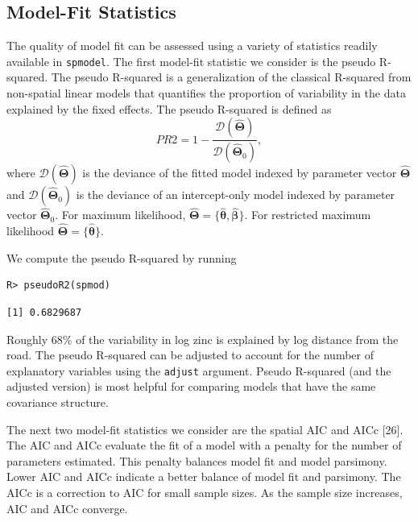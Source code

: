 \documentclass[10pt,letterpaper]{article}
\begin{document}
\hypertarget{model-fit-statistics}{%
\subsection{Model-Fit Statistics}\label{model-fit-statistics}}

The quality of model fit can be assessed using a variety of statistics
readily available in \texttt{spmodel}. The first model-fit statistic we
consider is the pseudo R-squared. The pseudo R-squared is a
generalization of the classical R-squared from non-spatial linear models
that quantifies the proportion of variability in the data explained by
the fixed effects. The pseudo R-squared is defined as \begin{equation*}
PR2 = 1 - \frac{\mathcal{D}(\boldsymbol{\hat{\Theta}})}{\mathcal{D}(\boldsymbol{\hat{\Theta}}_0)},
\end{equation*} where \(\mathcal{D}(\boldsymbol{\hat{\Theta}})\) is the
deviance of the fitted model indexed by parameter vector
\(\boldsymbol{\hat{\Theta}}\) and
\(\mathcal{D}(\boldsymbol{\hat{\Theta}}_0)\) is the deviance of an
intercept-only model indexed by parameter vector
\(\boldsymbol{\hat{\Theta}}_0\). For maximum likelihood,
\(\hat{\boldsymbol{\Theta}} = \{\hat{\boldsymbol{\theta}}, \hat{\boldsymbol{\beta}}\}\).
For restricted maximum likelihood
\(\hat{\boldsymbol{\Theta}} = \{\hat{\boldsymbol{\theta}}\}\).

We compute the pseudo R-squared by running

\begin{verbatim}
R> pseudoR2(spmod)
\end{verbatim}

\begin{verbatim}
[1] 0.6829687
\end{verbatim}

Roughly 68\% of the variability in log zinc is explained by log distance
from the road. The pseudo R-squared can be adjusted to account for the
number of explanatory variables using the \texttt{adjust} argument.
Pseudo R-squared (and the adjusted version) is most helpful for
comparing models that have the same covariance structure.

The next two model-fit statistics we consider are the spatial AIC and
AICc {[}26{]}. The AIC and AICc evaluate the fit of a model with a
penalty for the number of parameters estimated. This penalty balances
model fit and model parsimony. Lower AIC and AICc indicate a better
balance of model fit and parsimony. The AICc is a correction to AIC for
small sample sizes. As the sample size increases, AIC and AICc converge.
\end{document}
